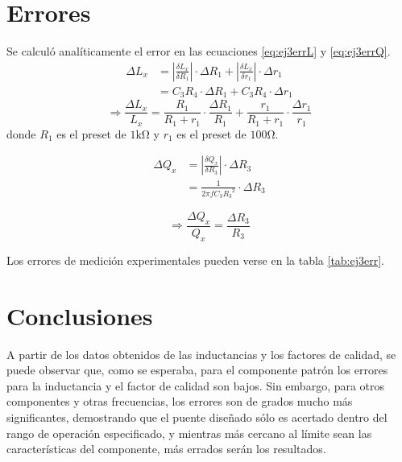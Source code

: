     \section{Errores}
    Se calculó analíticamente el error en las ecuaciones \ref{eq:ej3errL} y \ref{eq:ej3errQ}.
    \begin{equation*}
        \begin{split}
            \Delta L_x &=\left| \frac{\delta L_x}{\delta R_1} \right| \cdot \Delta R_1 + \left| \frac{\delta L_x}{\delta r_1} \right| \cdot \Delta r_1\\
                       &= C_3 R_4 \cdot \Delta R_1 + C_3 R_4 \cdot \Delta r_1
        \end{split}
    \end{equation*}
    \begin{equation}
        \Rightarrow\frac{\Delta L_x}{L_x} = \frac{R_1}{R_1+r_1}\cdot\frac{\Delta R_1}{R_1} + \frac{r_1}{R_1+r_1}\cdot\frac{\Delta r_1}{r_1}
        \label{eq:ej3errL}
    \end{equation}
    donde $R_1$ es el preset de $1\si{\kilo\ohm}$ y $r_1$ es el preset de $100\si{\ohm}$.

    \begin{equation*}
        \begin{split}
            \Delta Q_x &= \left| \frac{\delta Q_x}{\delta R_3} \right| \cdot \Delta R_3\\
                       &= \frac{1}{ 2 \pi f C_3 {R_3}^2} \cdot \Delta R_3
        \end{split}
    \end{equation*}

    \begin{equation}
        \Rightarrow\frac{\Delta Q_x}{Q_x} = \frac{\Delta R_3}{R_3}
        \label{eq:ej3errQ}
    \end{equation}

    
    

    Los errores de medición experimentales pueden verse en la tabla \ref{tab:ej3err}.

    \section{Conclusiones}

    A partir de los datos obtenidos de las inductancias y los factores de calidad, se puede
    observar que, como se esperaba, para el componente patrón los errores para la inductancia
    y el factor de calidad son bajos. Sin embargo, para otros componentes y otras frecuencias,
    los errores son de grados mucho más significantes, demostrando que el puente diseñado
    sólo es acertado dentro del rango de operación especificado, y mientras más cercano al
    límite sean las características del componente, más errados serán los resultados.

